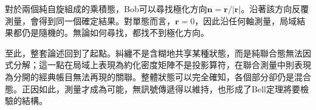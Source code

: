 對於兩個純自旋組成的乘積態，Bob可以尋找極化方向\(\mathbf n=\mathbf r/|\mathbf r|\)。沿著該方向反覆測量，會得到同一個確定結果。對單態而言，\(\mathbf r=0\)，因此沿任何軸測量，局域結果都仍是隨機的。無論如何尋找，都找不到極化方向。

\begin{classroomqa}
\end{classroomqa}

\begin{classroomqa}
\end{classroomqa}

至此，整套論述回到了起點。糾纏不是含糊地共享某種狀態，而是純聯合態無法因式分解；這一點在局域上表現為約化密度矩陣不是投影算符，在聯合測量中則表現為分開的經典帳目無法再現的關聯。整體狀態可以完全確知，各個部分卻仍是混合態。正因如此，測量才成為可能，無訊號傳遞得以維持，也形成了Bell定理將要檢驗的結構。
